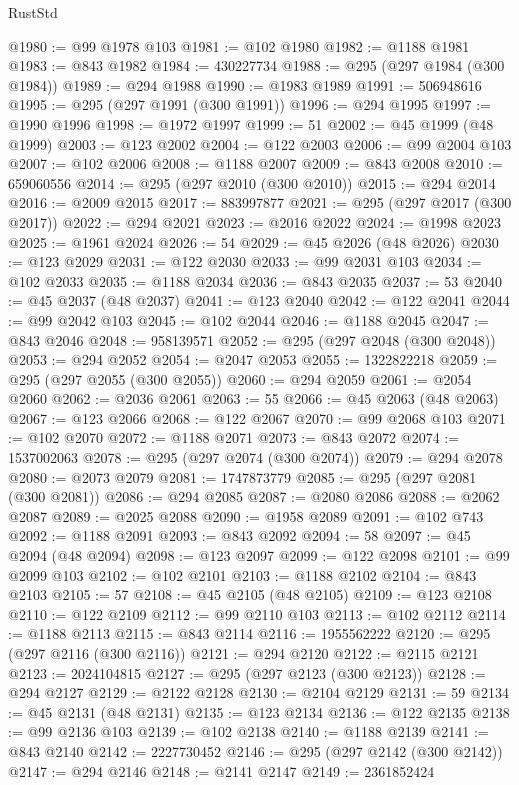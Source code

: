\begin{lexlean}{RustStd}
\begin{coremodule}
@1980 := @99 @1978 @103
@1981 := @102 @1980
@1982 := @1188 @1981
@1983 := @843 @1982
@1984 := 430227734
@1988 := @295 (@297 @1984 (@300 @1984))
@1989 := @294 @1988
@1990 := @1983 @1989
@1991 := 506948616
@1995 := @295 (@297 @1991 (@300 @1991))
@1996 := @294 @1995
@1997 := @1990 @1996
@1998 := @1972 @1997
@1999 := 51
@2002 := @45 @1999 (@48 @1999)
@2003 := @123 @2002
@2004 := @122 @2003
@2006 := @99 @2004 @103
@2007 := @102 @2006
@2008 := @1188 @2007
@2009 := @843 @2008
@2010 := 659060556
@2014 := @295 (@297 @2010 (@300 @2010))
@2015 := @294 @2014
@2016 := @2009 @2015
@2017 := 883997877
@2021 := @295 (@297 @2017 (@300 @2017))
@2022 := @294 @2021
@2023 := @2016 @2022
@2024 := @1998 @2023
@2025 := @1961 @2024
@2026 := 54
@2029 := @45 @2026 (@48 @2026)
@2030 := @123 @2029
@2031 := @122 @2030
@2033 := @99 @2031 @103
@2034 := @102 @2033
@2035 := @1188 @2034
@2036 := @843 @2035
@2037 := 53
@2040 := @45 @2037 (@48 @2037)
@2041 := @123 @2040
@2042 := @122 @2041
@2044 := @99 @2042 @103
@2045 := @102 @2044
@2046 := @1188 @2045
@2047 := @843 @2046
@2048 := 958139571
@2052 := @295 (@297 @2048 (@300 @2048))
@2053 := @294 @2052
@2054 := @2047 @2053
@2055 := 1322822218
@2059 := @295 (@297 @2055 (@300 @2055))
@2060 := @294 @2059
@2061 := @2054 @2060
@2062 := @2036 @2061
@2063 := 55
@2066 := @45 @2063 (@48 @2063)
@2067 := @123 @2066
@2068 := @122 @2067
@2070 := @99 @2068 @103
@2071 := @102 @2070
@2072 := @1188 @2071
@2073 := @843 @2072
@2074 := 1537002063
@2078 := @295 (@297 @2074 (@300 @2074))
@2079 := @294 @2078
@2080 := @2073 @2079
@2081 := 1747873779
@2085 := @295 (@297 @2081 (@300 @2081))
@2086 := @294 @2085
@2087 := @2080 @2086
@2088 := @2062 @2087
@2089 := @2025 @2088
@2090 := @1958 @2089
@2091 := @102 @743
@2092 := @1188 @2091
@2093 := @843 @2092
@2094 := 58
@2097 := @45 @2094 (@48 @2094)
@2098 := @123 @2097
@2099 := @122 @2098
@2101 := @99 @2099 @103
@2102 := @102 @2101
@2103 := @1188 @2102
@2104 := @843 @2103
@2105 := 57
@2108 := @45 @2105 (@48 @2105)
@2109 := @123 @2108
@2110 := @122 @2109
@2112 := @99 @2110 @103
@2113 := @102 @2112
@2114 := @1188 @2113
@2115 := @843 @2114
@2116 := 1955562222
@2120 := @295 (@297 @2116 (@300 @2116))
@2121 := @294 @2120
@2122 := @2115 @2121
@2123 := 2024104815
@2127 := @295 (@297 @2123 (@300 @2123))
@2128 := @294 @2127
@2129 := @2122 @2128
@2130 := @2104 @2129
@2131 := 59
@2134 := @45 @2131 (@48 @2131)
@2135 := @123 @2134
@2136 := @122 @2135
@2138 := @99 @2136 @103
@2139 := @102 @2138
@2140 := @1188 @2139
@2141 := @843 @2140
@2142 := 2227730452
@2146 := @295 (@297 @2142 (@300 @2142))
@2147 := @294 @2146
@2148 := @2141 @2147
@2149 := 2361852424

\end{coremodule}
\end{lexlean}
